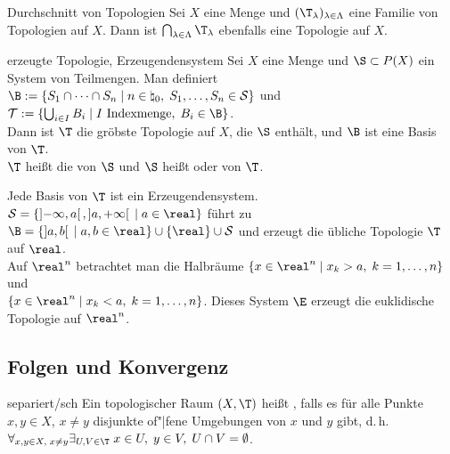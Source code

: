 \linie

\begin{Lemma}{Durchschnitt von Topologien}
    Sei $X$ eine Menge und $(\T_\lambda)_{\lambda \in \Lambda}$ eine Familie
    von Topologien auf $X$.
    Dann ist $\bigcap_{\lambda \in \Lambda} \T_\lambda$ ebenfalls eine
    Topologie auf $X$.
\end{Lemma}

\begin{Def}{erzeugte Topologie, Erzeugendensystem}
    Sei $X$ eine Menge und $\S \subset P(X)$ ein System von Teilmengen.
    Man definiert
    $\B := \{S_1 \cap \dotsb \cap S_n \;|\;
    n \in \natural_0,\; S_1, \dotsc, S_n \in \mathcal{S}\}$ und \\
    $\mathcal{T} := \{\bigcup_{i \in I} B_i \;|\; I \text{ Indexmenge},\;
    B_i \in \B\}$. \\
    Dann ist $\T$ die gröbste Topologie auf $X$, die $\S$ enthält,
    und $\B$ ist eine Basis von $\T$. \\
    $\T$ heißt die von $\S$  und
    $\S$ heißt  oder  von $\T$.
\end{Def}

\begin{Bsp}
    Jede Basis von $\T$ ist ein Erzeugendensystem. \\
    $\mathcal{S} =
    \{\left]-\infty, a\right[, \left]a, +\infty\right[ \;|\; a \in \real\}$
    führt zu $\B = \{\left]a, b\right[ \;|\; a, b \in \real\}
    \cup \{\real\} \cup \mathcal{S}$
    und erzeugt die übliche Topologie $\T$ auf $\real$. \\
    Auf $\real^n$ betrachtet man die Halbräume
    $\{x \in \real^n \;|\; x_k > a,\; k = 1, \dotsc, n\}$ und \\
    $\{x \in \real^n \;|\; x_k < a,\; k = 1, \dotsc, n\}$.
    Dieses System $\E$ erzeugt die euklidische Topologie auf $\real^n$.
\end{Bsp}

\subsection{%
    Folgen und Konvergenz%
}

\begin{Def}{separiert/sch}
    Ein topologischer Raum $(X, \T)$ heißt
    ,
    falls es für alle Punkte $x, y \in X$, $x \not= y$
    disjunkte of"|fene Umgebungen von $x$ und $y$ gibt, d.\,h.
    $\forall_{x, y \in X,\; x \not= y} \exists_{U, V \in \T}\;
    x \in U,\; y \in V,\; U \cap V = \emptyset$.
\end{Def}

